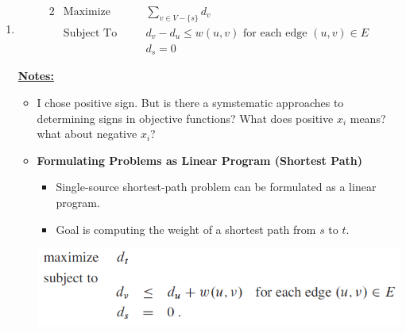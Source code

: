 \documentclass[12pt]{article}
\begin{document}
\begin{enumerate}[1.]
    \item

    \bigskip

    \begin{alignat*}{2}
        & \text{Maximize}   & \quad & \sum\limits_{v \in V - \{s\}} d_v           \\
        & \text{Subject To} &       & d_v - d_u \leq w(u,v) \text{ for each edge $(u,v) \in E$}\\
        &                   &       & d_s = 0
    \end{alignat*}




    \underline{\textbf{Notes:}}

    \bigskip

    \begin{itemize}
        \item I chose positive sign. But is there a symstematic approaches to
        determining signs in objective functions? What does positive $x_i$ means?
        what about negative $x_i$?
        \item \textbf{Formulating Problems as Linear Program (Shortest Path)}

        \begin{itemize}
            \item Single-source shortest-path problem can be formulated as a linear program.
            \item Goal is computing the weight of a shortest path from $s$ to $t$.
        \end{itemize}

        \bigskip

        \begin{center}
        \includegraphics[width=0.7\linewidth]{images/worksheet_6_solution_16.png}
        \end{center}


\end{itemize}
\end{enumerate}
\end{document}
